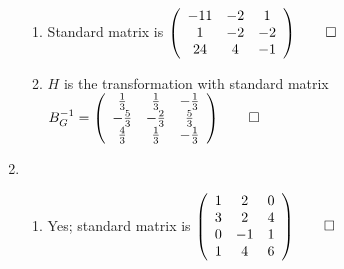 \documentclass[12pt, a4paper]{article}
\begin{document}
\begin{enumerate}[Q\arabic*.]
\begin{enumerate}[(\alph*)]
      \item Standard matrix is $\left(\begin{array}{ccc} -11 & -2 & 1\\ 1 & -2 & -2\\ 24 & 4 & -1 \end{array}\right) \qed$

      \item $H$ is the transformation with standard matrix $B_G^{-1} = \left(\begin{array}{ccc} \frac{1}{3} & \frac{1}{3} & -\frac{1}{3}\\ -\frac{5}{3} & -\frac{2}{3} & \frac{5}{3}\\ \frac{4}{3} & \frac{1}{3} & -\frac{1}{3} \end{array}\right) \qed$
    \end{enumerate}
    \pagebreak

  \item 
    \begin{enumerate}[(\alph*)]
      \item Yes; standard matrix is $\left(\begin{array}{ccc} 1 & 2 & 0\\ 3 & 2 & 4\\ 0 & -1 & 1\\ 1 & 4 & 6 \end{array}\right) \qed$


\end{enumerate}
\end{enumerate}
\end{document}

